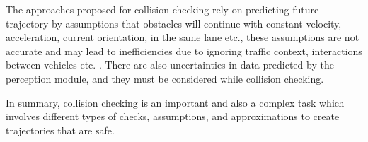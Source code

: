 The approaches proposed for collision checking rely on predicting future trajectory by assumptions that obstacles will continue with constant velocity, acceleration, current orientation, in the same lane etc., these assumptions are not accurate and may lead to inefficiencies due to ignoring traffic context, interactions between vehicles etc. \cite{motion_planning_techniques}. There are also uncertainties in data predicted by the perception module, and they must be considered while collision checking.

In summary, collision checking is an important and also a complex task which involves different types of checks, assumptions, and approximations to create trajectories that are safe.


